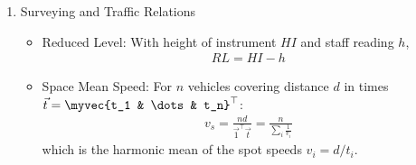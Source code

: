 \begin{enumerate}[label=\thesubsection.\arabic*, ref=\thesubsection.\theenumi,itemsep=0pt]
\item Surveying and Traffic Relations
\begin{itemize}
\item Reduced Level:
With height of instrument $HI$ and staff reading $h$,
\begin{align} %
RL = HI - h
\label{eq:rl} %
\end{align}
\item Space Mean Speed:
For $n$ vehicles covering distance $d$ in times $\vec{t} = \myvec{t_1 & \dots & t_n}^\top$:
\begin{align}
v_s = \frac{nd}{\vec{1}^\top \vec{t}} = \frac{n}{\sum_i \frac{1}{v_i}}
\label{eq:sms} %
\end{align}
which is the harmonic mean of the spot speeds $v_i = d / t_i$.
\end{itemize}

\end{enumerate}

